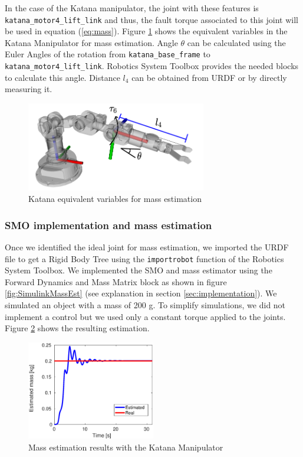 \documentclass[a4paper, 10pt]{article}
\begin{document}
In the case of the Katana manipulator, the joint with these features is \texttt{katana\_motor4\_lift\_link} and thus, the fault torque associated to this joint will be used in equation (\ref{eq:mass}). Figure \ref{fig:katana_joints} shows the equivalent variables in the Katana Manipulator for mass estimation. Angle $\theta$ can be calculated using the Euler Angles of the rotation from \texttt{katana\_base\_frame} to \texttt{katana\_motor4\_lift\_link}. Robotics System Toolbox provides the needed blocks to calculate this angle. Distance $l_4$ can be obtained from URDF or by directly measuring it. 

\begin{figure}
  \centering
  \includegraphics[width=0.7\textwidth]{Figures/katana_joints.png}
  \caption{Katana equivalent variables for mass estimation}
  \label{fig:katana_joints}
\end{figure}

\subsubsection*{SMO implementation and mass estimation}
Once we identified the ideal joint for mass estimation, we imported the URDF file to get a Rigid Body Tree using the \texttt{importrobot} function of the Robotics System Toolbox. We implemented the SMO and mass estimator using the Forward Dynamics and Mass Matrix block as shown in figure \ref{fig:SimulinkMassEst} (see explanation in section \ref{sec:implementation}). We simulated an object with a mass of 200 g. To simplify simulations, we did not implement a control but we used only a constant torque applied to the joints. Figure \ref{fig:katana_results} shows the resulting estimation. 

\begin{figure}
  \centering
  \includegraphics[width=0.5\textwidth]{Figures/katana_mass_est.eps}
  \caption{Mass estimation results with the Katana Manipulator}
  \label{fig:katana_results}
\end{figure}
\end{document}
